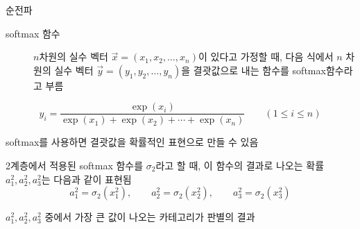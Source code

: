\documentclass[10pt,t]{beamer}
\begin{document}
\begin{frame}{순전파}
\pagebreak

\begin{description}
    \item[softmax 함수] $n$차원의 실수 벡터 $\vec{x}=(x_1, x_2, \ldots, x_n)$이 있다고 가정할 때, 다음 식에서 $n$ 차원의 실수 벡터 $\vec{y}=(y_1, y_2, \ldots, y_n)$을 결괏값으로 내는 함수를 softmax함수라고 부름 
\end{description}
\[y_i = \frac{\exp(x_i)}{\exp(x_1)+\exp(x_2)+\cdots+\exp(x_n)}\qquad (1\leq i \leq n)\]

softmax를 사용하면 결괏값을 확률적인 표현으로 만들 수 있음

2계층에서 적용된 softmax 함수를 $\sigma_2$라고 할 때, 이 함수의 결과로 나오는 확률 $a_1^2, a_2^2, a_3^2$는 다음과 같이 표현됨
\[a_1^2=\sigma_2(x_1^2), \qquad a_2^2=\sigma_2(x_2^2), \qquad a_3^2=\sigma_2(x_3^2)\]

$a_1^2, a_2^2, a_3^2$ 중에서 가장 큰 값이 나오는 카테고리가 판별의 결과

\end{frame}
\end{document}
